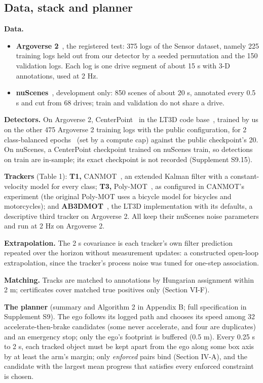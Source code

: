 \documentclass{ieeeaccess}
\begin{document}
\subsection{Data, stack and planner}
\textbf{Data.}

\begin{itemize}
\item \textbf{Argoverse 2}~\cite{Argoverse2}, the registered test: 375 logs of the Sensor dataset, namely 225 training logs held out from our detector by a seeded permutation and the 150 validation logs. Each log is one drive segment of about 15 s with 3-D annotations, used at 2 Hz.
\item \textbf{nuScenes}~\cite{Caesar2020}, development only: 850 scenes of about 20 s, annotated every 0.5 s and cut from 68 drives; train and validation do not share a drive.
\end{itemize}

\textbf{Detectors.} On Argoverse 2, CenterPoint~\cite{Yin2021} in the LT3D code base~\cite{Peri2022}, trained by us on the other 475 Argoverse 2 training logs with the public configuration, for 2 class-balanced epochs~\cite{Zhu2019cbgs} (set by a compute cap) against the public checkpoint's 20. On nuScenes, a CenterPoint checkpoint trained on nuScenes train, so detections on train are in-sample; its exact checkpoint is not recorded (Supplement S9.15).

\textbf{Trackers} (Table 1): \textbf{T1,} CANMOT~\cite{Osterburg2026}, an extended Kalman filter with a constant-velocity model for every class; \textbf{T3,} Poly-MOT~\cite{Li2023}, as configured in CANMOT's  experiment (the original Poly-MOT uses a bicycle model for bicycles and motorcycles); and \textbf{AB3DMOT}~\cite{Weng2020}, the LT3D implementation with its defaults, a descriptive third tracker on Argoverse 2. All keep their nuScenes noise parameters and run at 2 Hz on Argoverse 2.

\textbf{Extrapolation.} The 2 s covariance is each tracker's own filter prediction repeated over the horizon without measurement updates: a constructed open-loop extrapolation, since the tracker's process noise was tuned for one-step association.

\textbf{Matching.} Tracks are matched to annotations by Hungarian assignment within 2 m; certificates cover matched true positives only (Section VI-F).

\textbf{The planner} (summary and Algorithm 2 in Appendix B; full specification in Supplement S9). The ego follows its logged path and chooses its speed among 32 accelerate-then-brake candidates (some never accelerate, and four are duplicates) and an emergency stop; only the ego's footprint is buffered (0.5 m). Every 0.25 s to 2 s, each tracked object must be kept apart from the ego along some box axis by at least the arm's margin; only \emph{enforced} pairs bind (Section IV-A), and the candidate with the largest mean progress that satisfies every enforced constraint is chosen.
\end{document}
